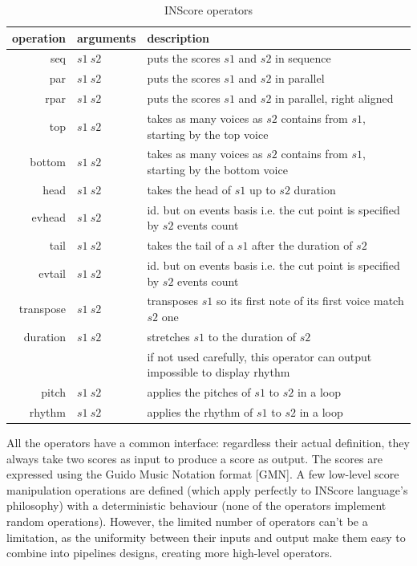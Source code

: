 \documentclass{article}
\begin{document}
\begin{table}[htdp]
\begin{center}
\begin{tabular}{rll}
\hline
operation & arguments		&	description \\
\hline
seq 	&	$s1\ s2$		& puts the scores $s1$ and $s2$ in sequence \\
par 	&	$s1\ s2$		& puts the scores $s1$ and $s2$ in parallel \\ 
rpar	&	$s1\ s2$		& puts the scores $s1$ and $s2$ in parallel, right aligned \\
top 	&	$s1\ s2$ 	& takes as many voices as $s2$ contains from $s1$, starting by the top voice \\
bottom 	&	$s1\ s2$ 	& takes as many voices as $s2$ contains from $s1$, starting by the bottom voice  \\
head	& 	$s1\ s2$	& takes the head of $s1$ up to $s2$ duration \\
evhead 	&	$s1\ s2$	& id. but on events basis i.e. the cut point is specified by $s2$ events count \\
tail	&	$s1\ s2$ 	& takes the tail of a $s1$ after the duration of $s2$ \\
evtail 	&	$s1\ s2$ 	& id. but on events basis i.e. the cut point is specified by $s2$ events count \\
transpose 	&	$s1\ s2$	& transposes $s1$ so its first note of its first voice match $s2$ one \\
duration 	&	$s1\ s2$	& stretches $s1$ to the duration of $s2$  \\
			& 	& if not used carefully, this operator can output impossible to display rhythm\\
pitch 	&	$s1\ s2$	& applies the pitches of $s1$ to $s2$ in a loop \\
rhythm 	&	$s1\ s2$	& applies the rhythm of $s1$ to $s2$ in a loop \\
\hline
\end{tabular}
\end{center}

\caption{INScore operators}
\label{operations}
\end{table}

All the operators have a common interface: regardless their actual definition, they always take two scores as input to produce a score as output. The scores are expressed using the Guido Music Notation format [GMN]\cite{hoos98}. A few low-level score manipulation operations are defined (which apply perfectly to INScore language's philosophy) with a deterministic behaviour (none of the operators implement random operations). However, the limited number of operators can't be a limitation, as the uniformity between their inputs and output make them easy to combine into pipelines designs, creating more high-level operators.
\end{document}
